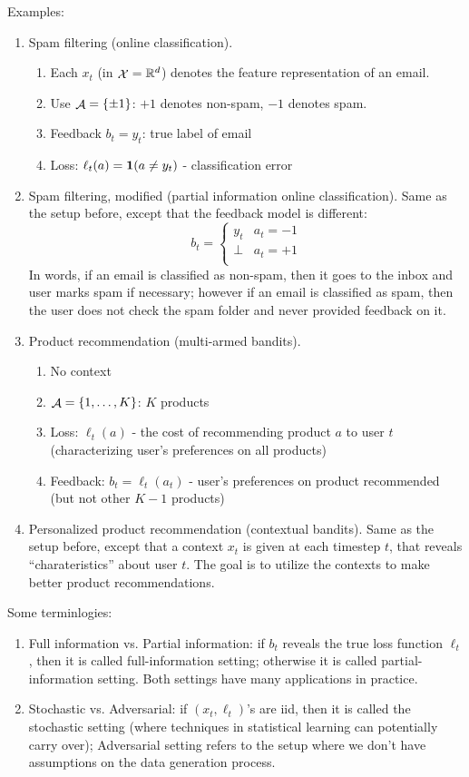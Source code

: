 \documentclass{article}
\DeclareMathOperator*{\Xcal}{{\cal X}}
\DeclareMathOperator{\Acal}{{\cal A}}
\newcommand{\RR}{\mathbb{R}} %
\newcommand*{\one}{{\bf 1}}
\begin{document}
Examples:
\begin{enumerate}
\item Spam filtering (online classification).
\begin{enumerate}
  \item Each $x_t$ (in $\Xcal = \RR^d$) denotes the feature representation
of an email.
  \item Use $\Acal = \cbr{\pm 1}$: $+1$ denotes non-spam, $-1$ denotes spam.
  \item Feedback $b_t = y_t$: true label of email
  \item Loss: $\ell_t(a) = \one(a \neq y_t)$ - classification error
\end{enumerate}


\item Spam filtering, modified (partial information online classification).
Same as the setup before, except that the feedback model is different:
\[ b_t = \begin{cases} y_t & a_t = -1 \\ \bot & a_t = +1 \\ \end{cases} \]
In words, if an email is classified as non-spam, then it goes to the inbox and user marks
spam if necessary; however if an email is classified as spam, then the user does not
check the spam folder and never provided feedback on it.

\item Product recommendation (multi-armed bandits).
\begin{enumerate}
  \item No context
  \item $\Acal = \cbr{1,\ldots,K}$: $K$ products
  \item Loss: $\ell_t(a)$ - the cost of recommending product $a$ to user $t$ (characterizing user's preferences on all products)
  \item Feedback: $b_t = \ell_t(a_t)$ - user's preferences on product recommended (but not other $K-1$ products)
\end{enumerate}

\item Personalized product recommendation (contextual bandits).
Same as the setup before, except that a context $x_t$ is given at each timestep $t$, that reveals ``charateristics'' about user $t$. The goal is to utilize the contexts to make better product recommendations.
\end{enumerate}

Some terminlogies:
\begin{enumerate}
  \item Full information vs. Partial information: if $b_t$ reveals the true loss function $\ell_t$, then it is called full-information setting; otherwise it is called partial-information setting. Both settings have many applications in practice.
  \item Stochastic vs. Adversarial: if $(x_t, \ell_t)$'s are iid, then it is called the stochastic setting (where techniques in statistical learning can potentially carry over); Adversarial setting refers to the setup where we don't have assumptions on the data generation process.
\end{enumerate}
\end{document}
